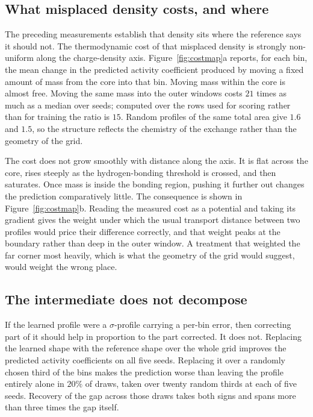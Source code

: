 \subsection{What misplaced density costs, and where}
\label{sec:cost}

The preceding measurements establish that density sits where the reference says it should not. The
thermodynamic cost of that misplaced density is strongly non-uniform along the charge-density
axis. Figure~\ref{fig:costmap}a reports, for each bin, the mean change in the predicted activity
coefficient produced by moving a fixed amount of mass from the core into that bin. Moving mass
within the core is almost free. Moving the same mass into the outer windows costs $21$ times as
much as a median over seeds; computed over the rows used for scoring rather than for training the
ratio is $15$. Random profiles of the
same total area give $1.6$ and $1.5$, so the structure reflects the chemistry of the exchange
rather than the geometry of the grid.

The cost does not grow smoothly with distance along the axis. It is flat across the core, rises
steeply as the hydrogen-bonding threshold is crossed, and then saturates. Once mass is inside the
bonding region, pushing it further out changes the prediction comparatively little. The
consequence is shown in Figure~\ref{fig:costmap}b. Reading the measured cost as a potential and
taking its gradient gives the weight under which the usual transport distance between two profiles
would price their difference correctly, and that weight peaks at the boundary rather than deep in
the outer window. A treatment that weighted the far corner most heavily, which is what the
geometry of the grid would suggest, would weight the wrong place.

\subsection{The intermediate does not decompose}
\label{sec:nonadditive}

If the learned profile were a $\sigma$-profile carrying a per-bin error, then correcting part of
it should help in proportion to the part corrected. It does not. Replacing the learned shape with
the reference shape over the whole grid improves the predicted activity coefficients on all five
seeds. Replacing it over a randomly chosen third of the bins makes the prediction worse than
leaving the profile entirely alone in $20\%$ of draws, taken over twenty random thirds at each of
five seeds. Recovery of the gap across those draws takes both signs and spans more than three
times the gap itself.

